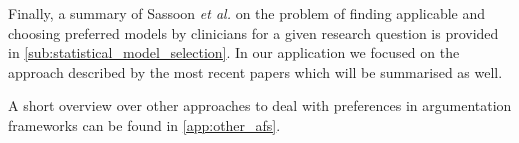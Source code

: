 Finally, a summary of Sassoon \textit{et al.} \cite{sassoon2014} on the problem of finding applicable and choosing preferred models by clinicians for a given research question is provided in \autoref{sub:statistical_model_selection}. In our application we focused on the approach described by the most recent papers \cite{sassoon2016,sassoon2016CD} which will be summarised as well.





A short overview over other approaches to deal with preferences in argumentation frameworks can be found in \autoref{app:other_afs}. 


% 
